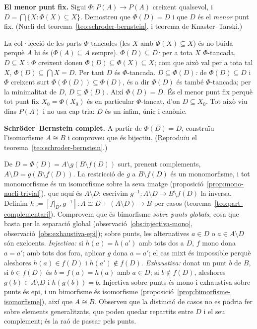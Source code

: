 \begin{exercici}
\textbf{El menor punt fix.} Sigui \(\Phi\colon P(A)\to P(A)\) creixent qualsevol, i \(D=\bigcap\{X : \Phi(X)\subseteq X\}\). Demostreu que \(\Phi(D)=D\) i que \(D\) és el \emph{menor} punt fix. (Nucli del teorema~\ref{teo:schroder-bernstein}, i teorema de Knaster--Tarski.)
\end{exercici}
\begin{solucio}
La col·lecció de les parts \(\Phi\)-tancades (les \(X\) amb \(\Phi(X)\subseteq X\)) és no buida perquè \(A\) hi és (\(\Phi(A)\subseteq A\) sempre). \emph{\(\Phi(D)\subseteq D\):} per a tota \(X\) \(\Phi\)-tancada, \(D\subseteq X\) i \(\Phi\) creixent donen \(\Phi(D)\subseteq\Phi(X)\subseteq X\); com que això val per a tota tal \(X\), \(\Phi(D)\subseteq\bigcap X=D\). Per tant \(D\) és \(\Phi\)-tancada. \emph{\(D\subseteq\Phi(D)\):} de \(\Phi(D)\subseteq D\) i \(\Phi\) creixent surt \(\Phi(\Phi(D))\subseteq\Phi(D)\), és a dir \(\Phi(D)\) és també \(\Phi\)-tancada; per la minimalitat de \(D\), \(D\subseteq\Phi(D)\). Així \(\Phi(D)=D\). És el menor punt fix perquè tot punt fix \(X_0=\Phi(X_0)\) és en particular \(\Phi\)-tancat, d'on \(D\subseteq X_0\). Tot això viu dins \(P(A)\) i no usa cap tria: \(D\) és un ínfim, únic i canònic.
\end{solucio}

\begin{exercici}
\textbf{Schröder--Bernstein complet.} A partir de \(\Phi(D)=D\), construïu l'isomorfisme \(A\cong B\) i comproveu que és bijectiu. (Reproduïu el teorema~\ref{teo:schroder-bernstein}.)
\end{exercici}
\begin{solucio}
De \(D=\Phi(D)=A\setminus g(B\setminus f(D))\) surt, prenent complements, \(A\setminus D=g(B\setminus f(D))\). La restricció de \(g\) a \(B\setminus f(D)\) és un monomorfisme, i tot monomorfisme és un isomorfisme sobre la seva imatge (proposició~\ref{prop:mono-nucli-trivial}), que aquí és \(A\setminus D\); escrivim \(g^{-1}\colon A\setminus D\to B\setminus f(D)\) la inversa. Definim \(h:=[f|_D,g^{-1}]\colon A\cong D+(A\setminus D)\to B\) per casos (teorema~\ref{teo:part-complementari}). Comprovem que és bimorfisme \emph{sobre punts globals}, cosa que basta per la separació global (observació~\ref{obs:injectiva-mono}, observació~\ref{obs:exhaustiva-epi}); sobre punts, les alternatives \(a\in D\) o \(a\in A\setminus D\) són excloents. \emph{Injectiva:} si \(h(a)=h(a')\) amb tots dos a \(D\), \(f\) mono dona \(a=a'\); amb tots dos fora, aplicar \(g\) dona \(a=a'\); el cas mixt és impossible perquè aleshores \(h(a)\in f(D)\) i \(h(a')\notin f(D)\). \emph{Exhaustiva:} donat un punt \(b\) de \(B\), si \(b\in f(D)\) és \(b=f(a)=h(a)\) amb \(a\in D\); si \(b\notin f(D)\), aleshores \(g(b)\in A\setminus D\) i \(h(g(b))=b\). Injectiva sobre punts és mono i exhaustiva sobre punts és epi, i un bimorfisme és isomorfisme (proposició~\ref{prop:bimorfisme-isomorfisme}), així que \(A\cong B\). Observeu que la distinció de casos no es podria fer sobre elements generalitzats, que poden quedar repartits entre \(D\) i el seu complement; és la raó de passar pels punts.
\end{solucio}

